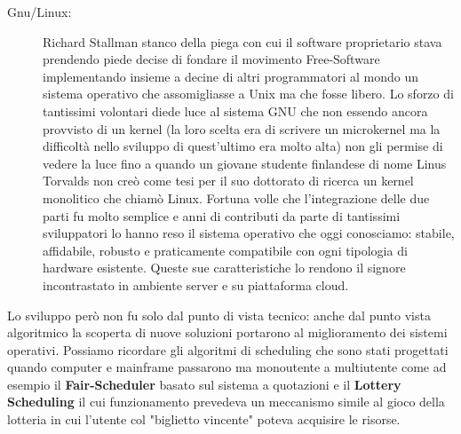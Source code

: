 \begin{description}
  \item[Gnu/Linux:] Richard Stallman stanco della piega con cui il software proprietario stava prendendo piede decise di fondare il movimento Free-Software implementando insieme a decine di altri programmatori al mondo un sistema operativo che assomigliasse a Unix ma che fosse libero. Lo sforzo di tantissimi volontari diede luce al sistema GNU che non essendo ancora provvisto di un kernel (la loro scelta era di scrivere un microkernel ma la difficoltà nello sviluppo di quest'ultimo era molto alta) non gli permise di vedere la luce fino a quando un giovane studente finlandese di nome Linus Torvalds non creò come tesi per il suo dottorato di ricerca un kernel monolitico che chiamò Linux. Fortuna volle che l'integrazione delle due parti fu molto semplice e anni di contributi da parte di tantissimi sviluppatori lo hanno reso il sistema operativo che oggi conosciamo: stabile, affidabile, robusto e praticamente compatibile con ogni tipologia di hardware esistente. Queste sue caratteristiche lo rendono il signore incontrastato in ambiente server e su piattaforma cloud.
\end{description}
Lo sviluppo però non fu solo dal punto di vista tecnico: anche dal punto vista algoritmico la scoperta di nuove soluzioni portarono al miglioramento dei sistemi operativi. Possiamo ricordare gli algoritmi di scheduling che sono stati progettati quando computer e mainframe passarono ma monoutente a multiutente come ad esempio il \textbf{Fair-Scheduler} basato sul sistema a quotazioni\cite{kay89} e il \textbf{Lottery Scheduling} il cui funzionamento prevedeva un meccanismo simile al gioco della lotteria in cui l'utente col "biglietto vincente" poteva acquisire le risorse.\cite{waldspurger94}
